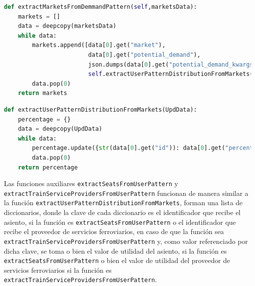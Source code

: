 \begin{lstlisting}[language=Python,
                   style=python,
                   frame=none,
                   numbers=none,
                   basicstyle=\ttfamily\normalsize,
                   caption={Función \texttt{extractMarketsFromDemmandPattern}},
                   label=src:functionExtractMarketsFromDemmandPattern,
                   inputencoding=utf8]                   
def extractMarketsFromDemmandPattern(self,marketsData):
    markets = []
    data = deepcopy(marketsData)
    while data:
        markets.append([data[0].get("market"),
                        data[0].get("potential_demand"),
                        json.dumps(data[0].get("potential_demand_kwargs")),
                        self.extractUserPatternDistributionFromMarkets(data[0].get("user_pattern_distribution"))])
        data.pop(0)
    return markets
\end{lstlisting}

\begin{lstlisting}[language=Python,
                   style=python,
                   frame=none,
                   numbers=none,
                   basicstyle=\ttfamily\normalsize,
                   caption={Función \texttt{extractUserPatternDistributionFromMarkets}},
                   label=src:functionExtractUserPatternDistributionFromMarkets,
                   inputencoding=utf8]                   
def extractUserPatternDistributionFromMarkets(UpdData):
    percentage = {}
    data = deepcopy(UpdData)
    while data:
        percentage.update({str(data[0].get("id")): data[0].get("percentage")})
        data.pop(0)
    return percentage
\end{lstlisting}

Las funciones auxiliares \texttt{extractSeatsFromUserPattern} y \texttt{extractTrainServiceProvidersFromUserPattern} funcionan de manera similar a la función \texttt{extractUserPatternDistributionFromMarkets}, forman una lista de diccionarios, donde la clave de cada diccionario es el identificador que recibe el asiento, si la función es \texttt{extractSeatsFromUserPattern} o el identificador que recibe el proveedor de servicios ferroviarios, en caso de que la función sea  \texttt{extractTrainServiceProvidersFromUserPattern} y, como valor referenciado por dicha clave, se toma o bien el valor de utilidad del asiento, si la función es \texttt{extractSeatsFromUserPattern} o bien el valor de utilidad del proveedor de servicios ferroviarios si la función es \texttt{extractTrainServiceProvidersFromUserPattern}.

